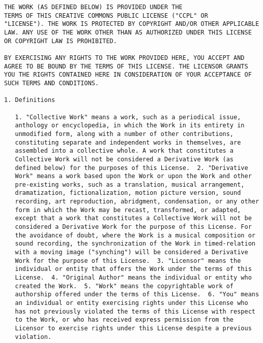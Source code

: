 \subsection{}\label{webots.copyright.intro}%

\begin{lstlisting}[firstnumber=1,]

THE WORK (AS DEFINED BELOW) IS PROVIDED UNDER THE
TERMS OF THIS CREATIVE COMMONS PUBLIC LICENSE ("CCPL" OR
"LICENSE"). THE WORK IS PROTECTED BY COPYRIGHT AND/OR OTHER APPLICABLE
LAW. ANY USE OF THE WORK OTHER THAN AS AUTHORIZED UNDER THIS LICENSE
OR COPYRIGHT LAW IS PROHIBITED.

BY EXERCISING ANY RIGHTS TO THE WORK PROVIDED HERE, YOU ACCEPT AND
AGREE TO BE BOUND BY THE TERMS OF THIS LICENSE. THE LICENSOR GRANTS
YOU THE RIGHTS CONTAINED HERE IN CONSIDERATION OF YOUR ACCEPTANCE OF
SUCH TERMS AND CONDITIONS.

1. Definitions

   1. "Collective Work" means a work, such as a periodical issue,
   anthology or encyclopedia, in which the Work in its entirety in
   unmodified form, along with a number of other contributions,
   constituting separate and independent works in themselves, are
   assembled into a collective whole. A work that constitutes a
   Collective Work will not be considered a Derivative Work (as
   defined below) for the purposes of this License.  2. "Derivative
   Work" means a work based upon the Work or upon the Work and other
   pre-existing works, such as a translation, musical arrangement,
   dramatization, fictionalization, motion picture version, sound
   recording, art reproduction, abridgment, condensation, or any other
   form in which the Work may be recast, transformed, or adapted,
   except that a work that constitutes a Collective Work will not be
   considered a Derivative Work for the purpose of this License. For
   the avoidance of doubt, where the Work is a musical composition or
   sound recording, the synchronization of the Work in timed-relation
   with a moving image ("synching") will be considered a Derivative
   Work for the purpose of this License.  3. "Licensor" means the
   individual or entity that offers the Work under the terms of this
   License.  4. "Original Author" means the individual or entity who
   created the Work.  5. "Work" means the copyrightable work of
   authorship offered under the terms of this License.  6. "You" means
   an individual or entity exercising rights under this License who
   has not previously violated the terms of this License with respect
   to the Work, or who has received express permission from the
   Licensor to exercise rights under this License despite a previous
   violation.


\end{lstlisting}
